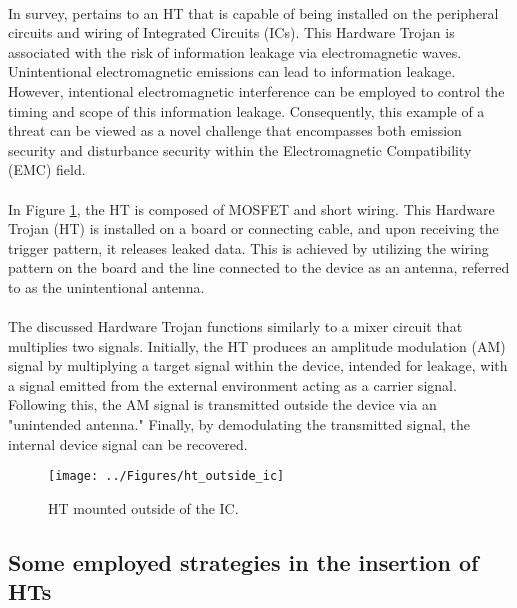 \paragraph*{}
In \cite{Kinugawa_Fujimoto_Hayashi_2019} survey, pertains to an HT that is capable of being installed on the peripheral circuits and wiring of Integrated Circuits (ICs). This Hardware Trojan is associated with the risk of information leakage via electromagnetic waves. Unintentional electromagnetic emissions can lead to information leakage. However, intentional electromagnetic interference can be employed to control the timing and scope of this information leakage. Consequently, this example of a threat can be viewed as a novel challenge that encompasses both emission security and disturbance security within the Electromagnetic Compatibility (EMC) field.
\paragraph*{}
In Figure \ref{fig:htoutsideic}, the HT is composed of MOSFET and short wiring. This Hardware Trojan (HT) is installed on a board or connecting cable, and upon receiving the trigger pattern, it releases leaked data. This is achieved by utilizing the wiring pattern on the board and the line connected to the device as an antenna, referred to as the unintentional antenna.
\paragraph*{}
The discussed Hardware Trojan functions similarly to a mixer circuit that multiplies two signals. Initially, the HT produces an amplitude modulation (AM) signal by multiplying a target signal within the device, intended for leakage, with a signal emitted from the external environment acting as a carrier signal. Following this, the AM signal is transmitted outside the device via an "unintended antenna." Finally, by demodulating the transmitted signal, the internal device signal can be recovered.
\begin{figure}[h]
	\centering
	\texttt{[image: ../Figures/ht\_outside\_ic]}
	\caption{HT mounted outside of the IC.}
	\label{fig:htoutsideic}
\end{figure}
\pagebreak
\subsection{Some employed strategies in the insertion of HTs}
